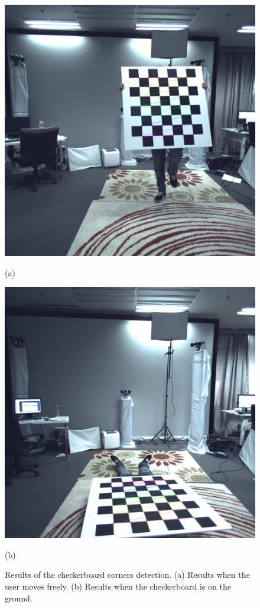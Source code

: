 \begin{figure}[ht]
%
\begin{minipage}[b]{.48\linewidth}
  \centering
\includegraphics[scale=0.058]{image/free.jpg}
  \vspace{0cm}
  \centerline{(a)}\medskip
\end{minipage}
\hfill
\begin{minipage}[b]{0.48\linewidth}
  \centering
\includegraphics[scale=0.058]{image/ground.jpg}
  \vspace{0cm}
  \centerline{(b)}\medskip
\end{minipage}
%
\caption{Results of the checkerboard corners detection. (a) Results when the user moves freely. (b) Results when the checkerboard is on the ground. }
\label{fig:checkerboard}
\end{figure}

